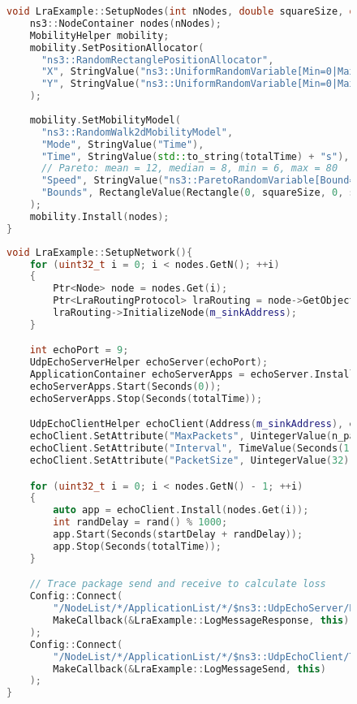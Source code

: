 \documentclass[../report.tex]{subfiles}
\begin{document}
\begin{figure}[H] %
\begin{lstlisting}[language=C++, caption={Simulation Node Initialization},captionpos=b]
void LraExample::SetupNodes(int nNodes, double squareSize, double totalTime){
    ns3::NodeContainer nodes(nNodes);
    MobilityHelper mobility;
    mobility.SetPositionAllocator(
      "ns3::RandomRectanglePositionAllocator",
      "X", StringValue("ns3::UniformRandomVariable[Min=0|Max="+squareSize+"]"),
      "Y", StringValue("ns3::UniformRandomVariable[Min=0|Max="+squareSize+"]")
    );
    
    mobility.SetMobilityModel(
      "ns3::RandomWalk2dMobilityModel",
      "Mode", StringValue("Time"),
      "Time", StringValue(std::to_string(totalTime) + "s"),
      // Pareto: mean = 12, median = 8, min = 6, max = 80
      "Speed", StringValue("ns3::ParetoRandomVariable[Bound=80|Scale=6|Shape=2]"),
      "Bounds", RectangleValue(Rectangle(0, squareSize, 0, squareSize))
    );
    mobility.Install(nodes);
}
\end{lstlisting}
\end{figure}

\begin{figure}[H] %
\begin{lstlisting}[language=C++, caption={Application Simulation Initialization},captionpos=b]
void LraExample::SetupNetwork(){
    for (uint32_t i = 0; i < nodes.GetN(); ++i)
    {
        Ptr<Node> node = nodes.Get(i);
        Ptr<LraRoutingProtocol> lraRouting = node->GetObject<LraRoutingProtocol>();
        lraRouting->InitializeNode(m_sinkAddress);
    }

    int echoPort = 9;
    UdpEchoServerHelper echoServer(echoPort);
    ApplicationContainer echoServerApps = echoServer.Install(nodes);
    echoServerApps.Start(Seconds(0));
    echoServerApps.Stop(Seconds(totalTime));

    UdpEchoClientHelper echoClient(Address(m_sinkAddress), echoPort);
    echoClient.SetAttribute("MaxPackets", UintegerValue(n_packets));
    echoClient.SetAttribute("Interval", TimeValue(Seconds(1.0)));
    echoClient.SetAttribute("PacketSize", UintegerValue(32));

    for (uint32_t i = 0; i < nodes.GetN() - 1; ++i)
    {
        auto app = echoClient.Install(nodes.Get(i));
        int randDelay = rand() % 1000;
        app.Start(Seconds(startDelay + randDelay));
        app.Stop(Seconds(totalTime));
    }

    // Trace package send and receive to calculate loss
    Config::Connect(
        "/NodeList/*/ApplicationList/*/$ns3::UdpEchoServer/RxWithAddresses",
        MakeCallback(&LraExample::LogMessageResponse, this)
    );
    Config::Connect(
        "/NodeList/*/ApplicationList/*/$ns3::UdpEchoClient/TxWithAddresses",
        MakeCallback(&LraExample::LogMessageSend, this)
    );
}
\end{lstlisting}
\end{figure}
\end{document}
